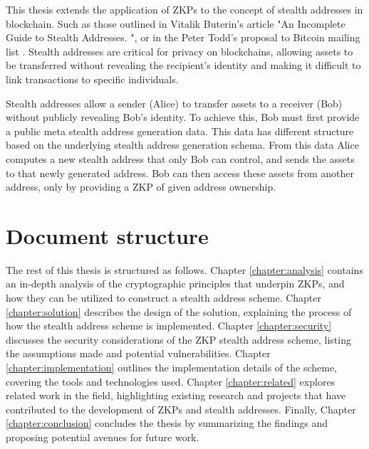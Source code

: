 This thesis extends the application of ZKPs to the concept of stealth
addresses in blockchain. Such as those outlined in Vitalik Buterin's article "An
Incomplete Guide to Stealth Addresses. "\cite{ButerinIncompleteGuide}, or
in the Peter Todd's proposal to Bitcoin mailing list \cite{ToddStealthAddresses}.
Stealth addresses are critical for privacy on blockchains, allowing assets to
be transferred without revealing the recipient's identity and making
it difficult to link transactions to specific individuals.

Stealth addresses allow a sender (Alice) to transfer assets to a receiver (Bob) without
publicly revealing Bob's identity. To achieve this, Bob
must first provide a public meta stealth address generation data. This data
has different structure based on the underlying stealth address generation
schema. From this data Alice computes a new stealth address that only Bob can
control, and sends the assets to that newly generated address. Bob can then
access these assets from another address, only by providing a ZKP of given
address ownership.

\section{Document structure}

The rest of this thesis is structured as follows. Chapter \ref{chapter:analysis}
contains an in-depth analysis of the cryptographic principles that underpin ZKPs,
and how they can be utilized to construct a stealth address scheme. Chapter
\ref{chapter:solution} describes the design of the solution, explaining the process
of how the stealth address scheme is implemented. Chapter \ref{chapter:security}
discusses the security considerations of the ZKP stealth address scheme, listing
the assumptions made and potential vulnerabilities. Chapter \ref{chapter:implementation}
outlines the implementation details of the scheme, covering the tools and technologies
used. Chapter \ref{chapter:related} explores related work in the field, highlighting
existing research and projects that have contributed to the development of ZKPs and
stealth addresses. Finally, Chapter \ref{chapter:conclusion} concludes the thesis by
summarizing the findings and proposing potential avenues for future work.

